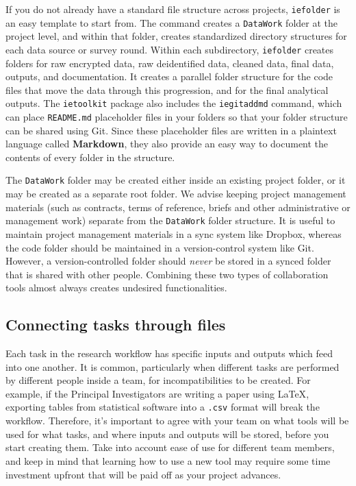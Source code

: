 If you do not already have a standard file structure across projects,
\texttt{iefolder} is an easy template to start from.
The command creates a \texttt{DataWork} folder at the project level,
and within that folder, creates standardized directory structures
for each data source or survey round.
Within each subdirectory, \texttt{iefolder} creates folders for raw encrypted data,
raw deidentified data, cleaned data, final data, outputs, and documentation.
It creates a parallel folder structure for the code files
that move the data through this progression,
and for the final analytical outputs.
The \texttt{ietoolkit} package also includes the \texttt{iegitaddmd} command,
which can place \texttt{README.md} placeholder files in your folders so that
your folder structure can be shared using Git.
Since these placeholder files are written in a plaintext language called \textbf{Markdown},
they also provide an easy way to document the contents of every folder in the structure.

The \texttt{DataWork} folder may be created either inside
an existing project folder, or it may be created as a separate root folder.
We advise keeping project management materials
(such as contracts, terms of reference, briefs and other administrative or management work)
separate from the \texttt{DataWork} folder structure.
It is useful to maintain project management materials in a sync system like Dropbox,
whereas the code folder should be maintained in a version-control system like Git.
However, a version-controlled folder should \textit{never}
be stored in a synced folder that is shared with other people.
Combining these two types of collaboration tools
almost always creates undesired functionalities.

\subsection{Connecting tasks through files}
Each task in the research workflow has specific inputs and outputs
which feed into one another.
It is common, particularly when different tasks are performed by different people inside a team,
for incompatibilities to be created.
For example, if the Principal Investigators are writing a paper using {\LaTeX},
exporting tables from statistical software into a \texttt{.csv} format will break the workflow.
Therefore, it's important to agree with your team on what tools will be used for what tasks,
and where inputs and outputs will be stored, before you start creating them.
Take into account ease of use for different team members,
and keep in mind that learning how to use a new tool may require some time investment upfront that will be paid off as your project advances.

